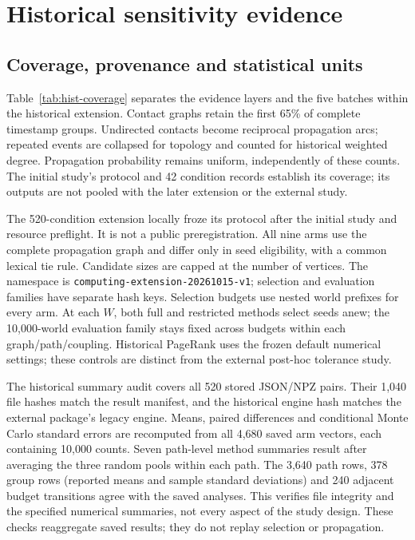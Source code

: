 \section{Historical sensitivity evidence}\label{sec:historical-evidence}
\subsection{Coverage, provenance and statistical units}
Table~\ref{tab:hist-coverage} separates the evidence layers and the five batches
within the historical extension. Contact graphs retain the first 65\% of complete
timestamp groups. Undirected contacts become reciprocal propagation arcs;
repeated events are collapsed for topology and counted for historical weighted
degree. Propagation probability remains uniform, independently of these counts.
The initial study's protocol and 42 condition records establish its coverage;
its outputs are not pooled with the later extension or the external study.


The 520-condition extension locally froze its protocol after the initial study
and resource preflight. It is not a public preregistration. All nine arms use
the complete propagation graph and differ only in seed eligibility, with a
common lexical tie rule. Candidate sizes are capped at the number of vertices.
The namespace is \texttt{computing-extension-20261015-v1}; selection and evaluation
families have separate hash keys. Selection budgets use nested world prefixes for every arm. At each $W$, both full and restricted methods select seeds anew; the 10,000-world evaluation family stays fixed across budgets within each graph/path/coupling.
Historical PageRank uses the frozen default numerical settings; these controls
are distinct from the external post-hoc tolerance study.

The historical summary audit covers all 520 stored JSON/NPZ pairs. Their 1,040 file
hashes match the result manifest, and the historical engine hash matches the
external package's legacy engine. Means, paired differences and conditional
Monte Carlo standard errors are recomputed from all 4,680 saved arm vectors,
each containing 10,000 counts. Seven path-level method summaries result after
averaging the three random pools within each path. The 3,640 path rows,
378 group rows (reported means and sample standard deviations) and 240 adjacent
budget transitions agree with the saved analyses. This verifies file integrity
and the specified numerical summaries, not every aspect of the study design.
These checks reaggregate saved results; they do not replay selection or propagation.

